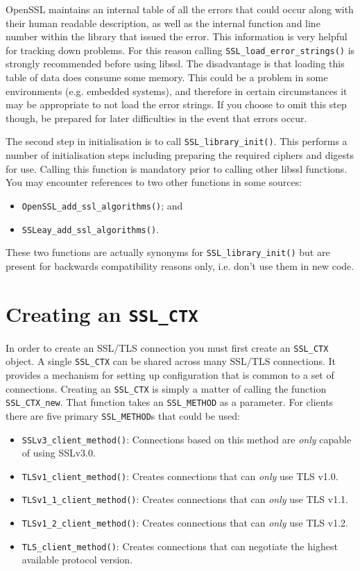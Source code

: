 OpenSSL maintains an internal table of all the errors that could occur along 
with their human readable description, as well as the internal function and 
line number within the library that issued the error. This information is very 
helpful for tracking down problems. For this reason calling 
\verb!SSL_load_error_strings()! is strongly recommended before using 
libssl. The disadvantage is that loading this table of data does consume some 
memory. This could be a problem in some environments (e.g. embedded systems), 
and therefore in certain circumstances it may be appropriate to not load the
error strings. If you choose to omit this step though, be prepared for later 
difficulties in the event that errors occur.

The second step in initialisation is to call \verb!SSL_library_init()!. 
This performs a number of initialisation steps including preparing the required 
ciphers and digests for use. Calling this function is mandatory prior to 
calling other libssl functions. You may encounter references to two other 
functions in some sources:
\begin{itemize}
\item\verb!OpenSSL_add_ssl_algorithms()!; and 
\item\verb!SSLeay_add_ssl_algorithms()!.
\end{itemize}
These two functions are actually  synonyms for \verb!SSL_library_init()! but are
present for backwards compatibility reasons only, i.e. don't use them in new
code.

\section{Creating an \texttt{SSL\_CTX}}

In order to create an SSL/TLS connection you must first create an
\verb!SSL_CTX! object. A single \verb!SSL_CTX! can be shared across
many SSL/TLS connections. It provides a mechanism for setting up configuration
that is common to a set of connections. Creating an \verb!SSL_CTX! is 
simply a matter of calling the function \verb!SSL_CTX_new!. That function 
takes an \verb!SSL_METHOD! as a parameter. For clients there are five 
primary \verb!SSL_METHOD!s that could be used:
\begin{itemize}
\item \verb!SSLv3_client_method()!: Connections based on this method are 
\emph{only} capable of using SSLv3.0.
\item \verb!TLSv1_client_method()!: Creates connections that can 
\emph{only} use TLS v1.0.
\item \verb!TLSv1_1_client_method()!: Creates connections that can 
\emph{only} use TLS v1.1.
\item \verb!TLSv1_2_client_method()!: Creates connections that can 
\emph{only} use TLS v1.2.
\item \verb!TLS_client_method()!: Creates connections that can negotiate 
the highest available protocol version.
\end{itemize}

